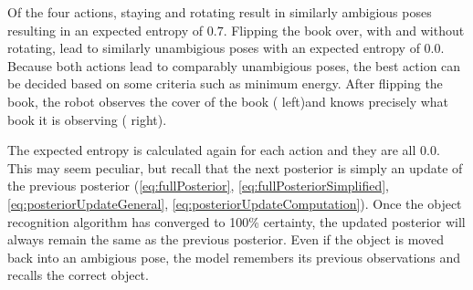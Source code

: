         Of the four actions, staying and rotating result in similarly ambigious poses resulting in an expected entropy of $0.7$. Flipping the book over, with and without rotating, lead to similarly unambigious poses with an expected entropy of $0.0$. Because both actions lead to comparably unambigious poses, the best action can be decided based on some criteria such as minimum energy. After flipping the book, the robot observes the cover of the book ( left)and knows precisely what book it is observing ( right).

        The expected entropy is calculated again for each action and they are all $0.0$. This may seem peculiar, but recall that the next posterior is simply an update of the previous posterior (\eqref{eq:fullPosterior}, \eqref{eq:fullPosteriorSimplified}, \eqref{eq:posteriorUpdateGeneral}, \eqref{eq:posteriorUpdateComputation}). Once the object recognition algorithm has converged to 100\% certainty, the updated posterior will always remain the same as the previous posterior. Even if the object is moved back into an ambigious pose, the model remembers its previous observations and recalls the correct object. 

